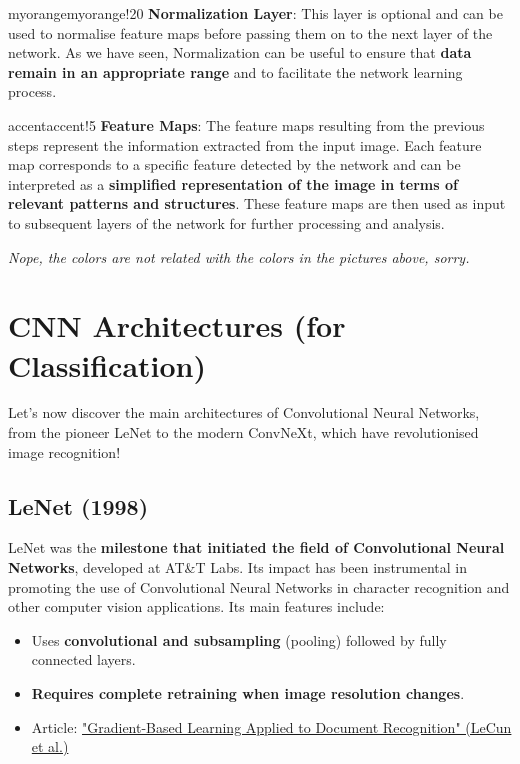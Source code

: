 \begin{remark}{myorange}{myorange!20}
\textbf{Normalization Layer}: This layer is optional and can be used to normalise feature maps before passing them on to the next layer of the network. As we have seen, Normalization can be useful to ensure that \textbf{data remain in an appropriate range} and to facilitate the network learning process.
\end{remark}

\begin{remark}{accent}{accent!5}
\textbf{Feature Maps}: The feature maps resulting from the previous steps represent the information extracted from the input image. Each feature map corresponds to a specific feature detected by the network and can be interpreted as a \textbf{simplified representation of the image in terms of relevant patterns and structures}. These feature maps are then used as input to subsequent layers of the network for further processing and analysis.
\end{remark}
\textit{Nope, the colors are not related with the colors in the pictures above, sorry.}

\section{CNN Architectures (for Classification)}

Let's now discover the main architectures of Convolutional Neural Networks, from the pioneer LeNet to the modern ConvNeXt, which have revolutionised image recognition!

\subsection{LeNet (1998)}
LeNet was the \textbf{milestone that initiated the field of Convolutional Neural Networks}, developed at AT\&T Labs. Its impact has been instrumental in promoting the use of Convolutional Neural Networks in character recognition and other computer vision applications. Its main features include:
\begin{itemize}
    \item Uses \textbf{convolutional and subsampling} (pooling) followed by fully connected layers.
    \item \textbf{Requires complete retraining when image resolution changes}.
    \item Article: \href{http://vision.stanford.edu/cs598_spring07/papers/Lecun98.pdf}{"Gradient-Based Learning Applied to Document Recognition" (LeCun et al.)}
\end{itemize}

